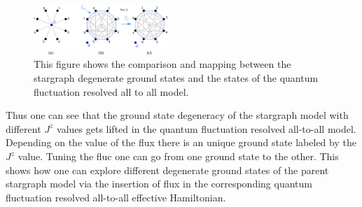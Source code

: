 \documentclass[reprint,prb,superscriptaddress]{revtex4-2}
\begin{document}
\begin{figure}[!hb]
\centering
\includegraphics[width=0.45\textwidth]{plt/stargraph-to-alltoall}
\caption{This figure shows the comparison and mapping between the stargraph degenerate ground states and the states of the quantum fluctuation resolved all to all model.}
\label{fig:stargraph-to-alltoall}
\end{figure}
Thus one can see that the ground state degeneracy of the stargraph model with different $J^z$ values gets lifted in the quantum fluctuation resolved all-to-all model. Depending on the value of the flux there is an unique ground state labeled by the $J^z$ value. Tuning the fluc one can go from one ground state to the other. This shows how one can explore different degenerate ground states of the parent stargraph model via the insertion of flux in the corresponding quantum fluctuation resolved all-to-all effective Hamiltonian.
\end{document}
